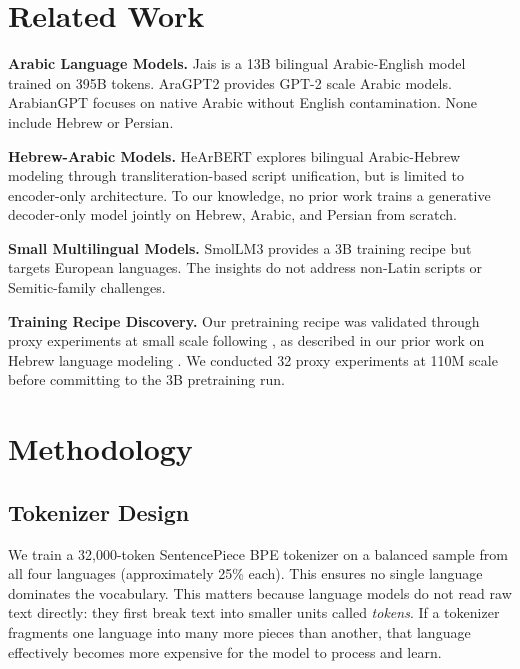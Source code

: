 \documentclass[10pt,twocolumn]{article}
\begin{document}
\section{Related Work}

\textbf{Arabic Language Models.} Jais \citep{sengupta2023jais} is a 13B bilingual Arabic-English model trained on 395B tokens. AraGPT2 \citep{antoun2021aragpt2} provides GPT-2 scale Arabic models. ArabianGPT \citep{koubaa2024arabiangpt} focuses on native Arabic without English contamination. None include Hebrew or Persian.

\textbf{Hebrew-Arabic Models.} HeArBERT \citep{rivas2024hearbert} explores bilingual Arabic-Hebrew modeling through transliteration-based script unification, but is limited to encoder-only architecture. To our knowledge, no prior work trains a generative decoder-only model jointly on Hebrew, Arabic, and Persian from scratch.

\textbf{Small Multilingual Models.} SmolLM3 \citep{allal2025smollm3} provides a 3B training recipe but targets European languages. The insights do not address non-Latin scripts or Semitic-family challenges.

\textbf{Training Recipe Discovery.} Our pretraining recipe was validated through proxy experiments at small scale following \citet{karpathy2026autoresearch}, as described in our prior work on Hebrew language modeling \citep{slasky2026hebrew}. We conducted 32 proxy experiments at 110M scale before committing to the 3B pretraining run.

\section{Methodology}

\subsection{Tokenizer Design}

We train a 32,000-token SentencePiece BPE tokenizer on a balanced sample from all four languages (approximately 25\% each). This ensures no single language dominates the vocabulary. This matters because language models do not read raw text directly: they first break text into smaller units called \emph{tokens}. If a tokenizer fragments one language into many more pieces than another, that language effectively becomes more expensive for the model to process and learn.
\end{document}
